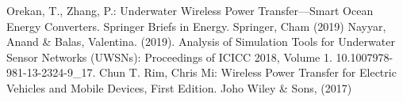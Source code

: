  \begin{thebibliography}{99}
	 Orekan, T., Zhang, P.: Underwater Wireless Power Transfer—Smart Ocean Energy Converters. Springer Briefs in Energy. Springer, Cham (2019)
	 Nayyar, Anand \& Balas, Valentina. (2019). Analysis of Simulation Tools for Underwater Sensor Networks (UWSNs): Proceedings of ICICC 2018, Volume 1. 10.1007\/978-981-13-2324-9\_17. 
	 Chun T. Rim, Chris Mi: Wireless Power Transfer for Electric Vehicles and Mobile Devices, First Edition. Joho Wiley \& Sons, (2017)
	
 \end{thebibliography}